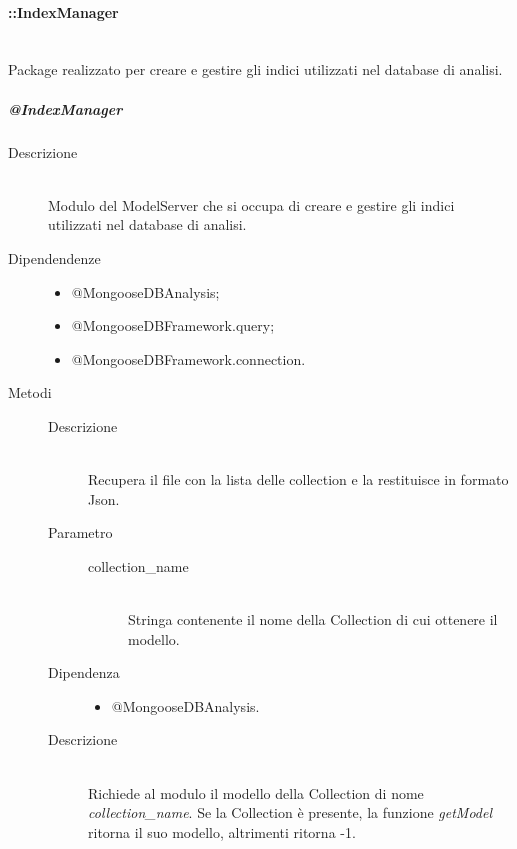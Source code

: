 \paragraph{::IndexManager} \hfill \\
Package realizzato per creare e gestire gli indici utilizzati nel database di analisi.
\subparagraph{@IndexManager} \hfill
\begin{description}
 \item[Descrizione] \hfill \\
 Modulo del ModelServer che si occupa di creare e gestire gli indici utilizzati nel database di analisi. 
  \item[Dipendendenze] \hfill
  \begin{itemize}
   \item @MongooseDBAnalysis;
   \item @MongooseDBFramework.query;
   \item @MongooseDBFramework.connection.
  \end{itemize}
 \item[Metodi]
  \begin{mldescription}
   	\begin{description}
   	 \item[Descrizione] \hfill \\
   	 Recupera il file con la lista delle collection e la restituisce in formato Json.
   	\end{description}
   	
	\begin{description}
	 \item[Parametro] \hfill
	  \begin{description}
	   \item[collection\_name] \hfill \\
	   Stringa contenente il nome della Collection di cui ottenere il modello.
	  \end{description}
	 \item[Dipendenza] \hfill
	  \begin{itemize}
	   \item @MongooseDBAnalysis.
	  \end{itemize}
	 \item[Descrizione] \hfill \\
	 Richiede al modulo  il modello della Collection di nome \textit{collection\_name}. Se la Collection è presente, la funzione \textit{getModel} ritorna il suo modello, altrimenti ritorna -1.
	\end{description}	    
    

\end{mldescription}
\end{description}
